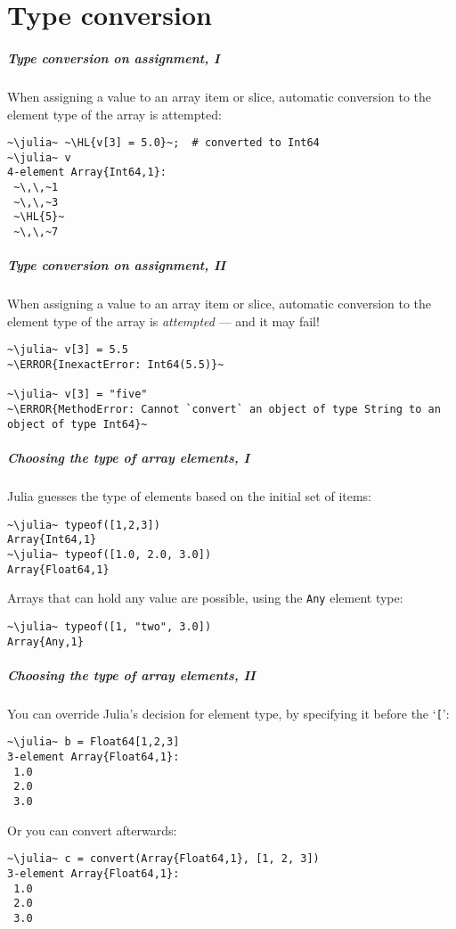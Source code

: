 \documentclass[english,serif,mathserif,xcolor=pdftex,dvipsnames,table]{beamer}
\begin{document}
\part{Type conversion}
\begin{frame}[fragile]
  \frametitle{Type conversion on assignment, I}
  When assigning a value to an array item or slice, automatic
  conversion to the element type of the array is attempted:
\begin{lstlisting}
~\julia~ ~\HL{v[3] = 5.0}~;  # converted to Int64
~\julia~ v
4-element Array{Int64,1}:
 ~\,\,~1
 ~\,\,~3
 ~\HL{5}~
 ~\,\,~7
\end{lstlisting}
\end{frame}


\begin{frame}
  \frametitle{Type conversion on assignment, II}
  When assigning a value to an array item or slice, automatic
  conversion to the element type of the array is \emph{attempted} ---
  and it may fail!
\begin{lstlisting}
~\julia~ v[3] = 5.5
~\ERROR{InexactError: Int64(5.5)}~

~\julia~ v[3] = "five"
~\ERROR{MethodError: Cannot `convert` an object of type String to an object of type Int64}~

\end{lstlisting}
\end{frame}


\begin{frame}
  \frametitle{Choosing the type of array elements, I}
  Julia guesses the type of elements based on the initial set of items:
\begin{lstlisting}
~\julia~ typeof([1,2,3])
Array{Int64,1}
~\julia~ typeof([1.0, 2.0, 3.0])
Array{Float64,1}
\end{lstlisting}

  \+ Arrays that can hold any value are possible, using the
  \texttt{Any} element type:
\begin{lstlisting}
~\julia~ typeof([1, "two", 3.0])
Array{Any,1}
\end{lstlisting}
\end{frame}


\begin{frame}
  \frametitle{Choosing the type of array elements, II}
  You can override Julia's decision for element type, by specifying it before the `\texttt{[}':
\begin{lstlisting}
~\julia~ b = Float64[1,2,3]
3-element Array{Float64,1}:
 1.0
 2.0
 3.0
\end{lstlisting}

  Or you can convert afterwards:
\begin{lstlisting}
~\julia~ c = convert(Array{Float64,1}, [1, 2, 3])
3-element Array{Float64,1}:
 1.0
 2.0
 3.0
\end{lstlisting}
\end{frame}
\end{document}
